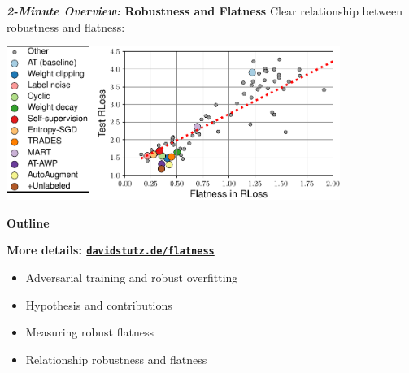 \documentclass[64pt,aspectratio=169]{beamer}
\begin{document}
	\begin{frame}[t]{\bfseries \textit{2-Minute Overview:} Robustness and Flatness}
		\Large
		Clear relationship between robustness and flatness:
		\vspace*{2px}
		\begin{center}
			\includegraphics[height=5cm]{plots/talk_flatness_correlation_seq_loss.pdf}
		\end{center}
	\end{frame}
	
	\begin{frame}[t]{\bfseries Outline}
		\Large
		\begin{tcolorbox}[
			enhanced,
			boxsep=4pt,
			left=0pt,
			right=0pt,
			top=2pt,
			toptitle=0pt,
			bottomtitle=2pt,
			bottom=0pt,
			colback=gray!12!white,
			colframe=gray!12!white,
			width=1\textwidth, 
			enlarge left by=0mm,
			arc=0pt,outer arc=0pt,
			boxrule=1pt,
			title=,
			coltitle=MPIIblack,
			colbacktitle=gray!12!white,
			titlerule style=white,
			collower=MPIIblack,
			]
			\color{MPIIblack}
			\bfseries More details: \href{http://davidstutz.de/flatness}{\texttt{davidstutz.de/flatness}}
		\end{tcolorbox}
		
		\begin{itemize}
			\item Adversarial training and robust overfitting
			\item Hypothesis and contributions
			\item Measuring robust flatness
			\item Relationship robustness and flatness
		\end{itemize}
	\end{frame}
	
\end{document}
